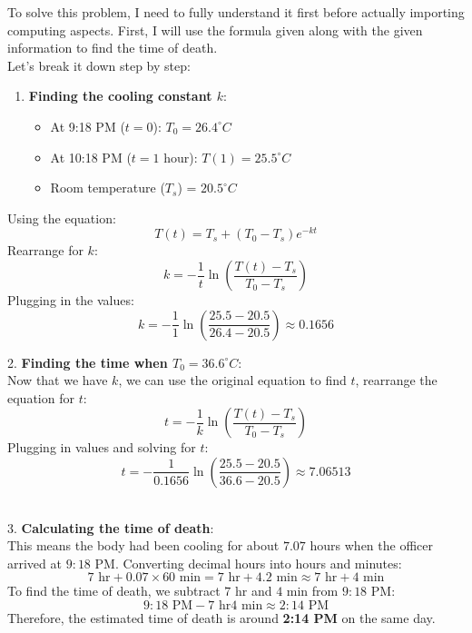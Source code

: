 \documentclass[a4paper, 12pt]{report}
\def\link{blue!50!black}
\begin{document}
    To solve this problem, I need to fully understand it first before actually importing computing aspects. First, I will use the formula given along with the given information to find the time of death.\\[4pt]
    Let's break it down step by step:\\[1.4em]
    \raggedright
    \begin{minipage}{0.55\textwidth}
        \begin{enumerate}[itemsep=-0.1cm]
            \item \textbf{Finding the cooling constant \( k \)}:
            \begin{itemize}
                \item At 9:18 PM (\( t = 0 \)): \( T_0 = 26.4^\circ C \)
                \item At 10:18 PM (\( t = 1 \) hour): \( T(1) = 25.5^\circ C \)
                \item Room temperature (\( T_s \)) = \( 20.5^\circ C \)
            \end{itemize}
        \end{enumerate}
        \centering
        Using the equation:
        \[ T(t) = T_s + (T_0 - T_s)e^{-kt} \]
        Rearrange for \( k \):
        \[ k = -\frac{1}{t} \ln\left(\frac{T(t) - T_s}{T_0 - T_s}\right) \]
        Plugging in the values:
        \[ k = -\frac{1}{1} \ln\left(\frac{25.5 - 20.5}{26.4 - 20.5}\right) \approx 0.1656 \]
    \end{minipage}\hfill
    \begin{minipage}{0.45\textwidth}
        2. \textbf{Finding the time when \( T_0 = 36.6^\circ C \)}:\\
        Now that we have \( k \), we can use the original equation to find \( t \), rearrange the equation for \( t \):
        \[ t = -\frac{1}{k} \ln\left(\frac{T(t) - T_s}{T_0 - T_s}\right) \]
        Plugging in values and solving for \( t \):
        \[ t = -\frac{1}{0.1656} \ln\left(\frac{25.5 - 20.5}{36.6 - 20.5}\right) \approx 7.06513 \]
    \end{minipage}\\
    \vspace{2em}
    3. \textbf{Calculating the time of death}:\\
    This means the body had been cooling for about \( 7.07 \) hours when the officer arrived at \( 9:18 \) PM. Converting decimal hours into hours and minutes:
    \[ 7 \text{ hr} + 0.07 \times 60 \text{ min} = 7 \text{ hr} + 4.2 \text{ min} \approx 7 \text{ hr} + 4 \text{ min} \]
    To find the time of death, we subtract \( 7 \text{ hr} \) and \( 4 \text{ min} \) from \( 9:18 \) PM:
    \[ 9:18 \text{ PM} - 7 \text{ hr} 4 \text{ min} \approx 2:14 \text{ PM} \]
    Therefore, the estimated time of death is around \textbf{2:14 PM} on the same day.\\[1em]
    \newpage
    
    \centering
    \vspace{1em}
    
\end{document}

